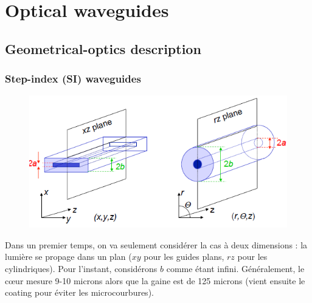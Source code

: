 \chapter{Optical waveguides}
\section{Geometrical-optics description}
\subsection{Step-index (SI) waveguides}
	\begin{figure}
	\vspace{-5mm}
	\includegraphics[scale=0.4]{ch1/image1}
	\end{figure}
Dans un premier temps, on va seulement considérer la cas à deux dimensions : 
la lumière se propage dans un plan ($xy$ pour les guides plans, $rz$ pour les cylindriques). 
Pour l'instant, considérons $b$ comme étant infini. Généralement, le cœur mesure 9-10 microns
alors que la gaine est de 125 microns (vient ensuite le coating pour éviter les microcourbures).\\

